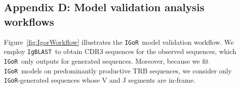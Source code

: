\documentclass{article}
\newcommand{\igor}{\texttt{IGoR}}
\newcommand{\igblast}{\texttt{IgBLAST}}
\begin{document}
\subsection*{Appendix D: Model validation analysis workflows}
Figure~\ref{fig:IgorWorkflow} illustrates the \igor\ model validation workflow.
We employ \igblast\ to obtain CDR3 sequences for the observed sequences, which \igor\ only outputs for generated sequences.
Moreover, because we fit \igor\ models on predominantly productive TRB sequences, we consider only \igor-generated sequences whose V and J segments are in-frame.

\end{document}
